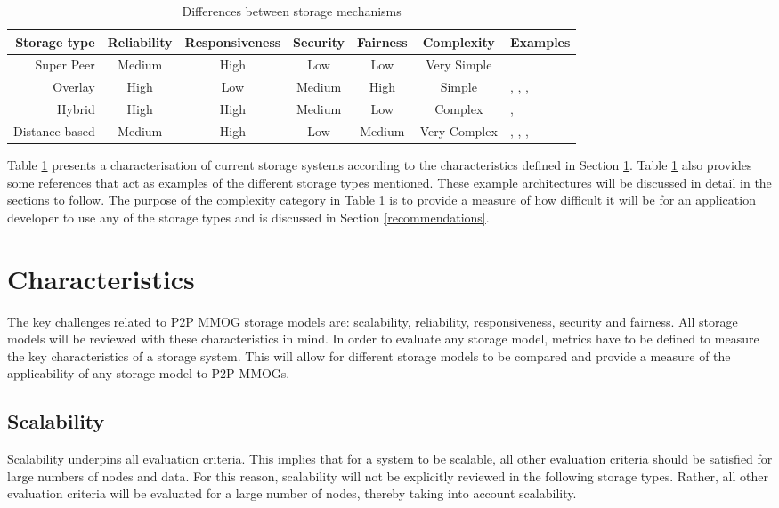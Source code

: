 \begin{table}[htbp]
\centering
\begin{tabular}{|r|c|c|c|c|c|l|}
\hline
Storage type & Reliability & Responsiveness & Security & Fairness & Complexity & Examples\\
\hline
Super Peer & Medium & High & Low & Low & Very Simple & \cite{knutsson_p2p_first}\\
Overlay & High & Low & Medium & High & Simple & \cite{Douglas05enablingmassively}, \cite{using_freenet_storage},
\cite{Fan_phd}, \cite{past_storage_focus}\\
Hybrid & High & High & Medium & Low & Complex & \cite{zoned_federation}, \cite{hybrid_storage1}\\
Distance-based & Medium & High & Low & Medium & Very Complex & \cite{Buyukkaya_voronoi_state_management}, \cite{Hu_voronoi_IM},
\cite{colyseus_distance_based}, \cite{solipsis}\\
\hline
\end{tabular}
\caption{Differences between storage mechanisms} \label{tab_storage}
\end{table}
%
Table \ref{tab_storage} presents a characterisation of current storage systems according to the characteristics defined in Section
\ref{key_challenges_cm}. Table \ref{tab_storage} also provides some references that act as examples of the different storage types mentioned. These
example architectures will be discussed in detail in the sections to follow. The purpose of the complexity category in Table \ref{tab_storage} is to
provide a measure of how difficult it will be for an application developer to use any of the storage types and is discussed in Section
\ref{recommendations}.

\section{Characteristics}
\label{key_challenges_cm}

The key challenges related to P2P MMOG storage models are: scalability, reliability, responsiveness, security and fairness. All storage models will be reviewed with these characteristics in mind. In order to evaluate any storage model, metrics have to be defined to measure the key characteristics of a storage system. This will allow for different storage models to be compared and provide a measure of the applicability of any storage model to P2P MMOGs.

\subsection{Scalability}
Scalability underpins all evaluation criteria. This implies that for a system to be scalable, all other evaluation criteria should be satisfied for
large numbers of nodes and data. For this reason, scalability will not be explicitly reviewed in the following storage types. Rather, all other
evaluation criteria will be evaluated for a large number of nodes, thereby taking into account scalability.

